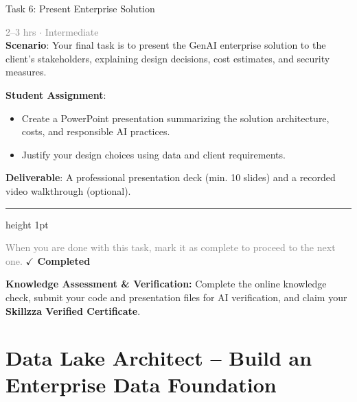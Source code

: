 \documentclass[10pt,a4paper]{article}
\begin{document}
\begin{taskbox}{Task 6: Present Enterprise Solution}

    {\small \textcolor{gray}{2--3 hrs $\cdot$ Intermediate}}\\[12pt]

    \textbf{Scenario}: Your final task is to present the GenAI enterprise solution to the client’s stakeholders, explaining design decisions, cost estimates, and security measures.  

\textbf{Student Assignment}:  
\begin{itemize}
    \item Create a PowerPoint presentation summarizing the solution architecture, costs, and responsible AI practices.  
    \item Justify your design choices using data and client requirements.  
\end{itemize}

\textbf{Deliverable}: A professional presentation deck (min. 10 slides) and a recorded video walkthrough (optional).\par

    \vspace{16pt}

    \textcolor{cardBorder}{\hrule height 1pt}\vspace{8pt}

    \small \textcolor{gray}{When you are done with this task, mark it as complete to proceed to the next one.} \hfill \textbf{\textcolor{brandDark}{$\checkmark$ Completed}}

\end{taskbox}

\begin{completionbox}
    \textbf{Knowledge Assessment \& Verification:} Complete the online knowledge check, submit your code and presentation files for AI verification, and claim your \textbf{Skillzza Verified Certificate}.
\end{completionbox}

\newpage




\section*{Data Lake Architect – Build an Enterprise Data Foundation}
\end{document}
